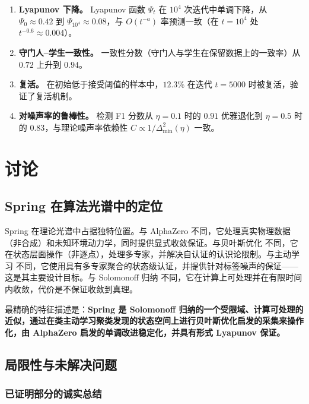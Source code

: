 \begin{enumerate}[nosep]
    \item \textbf{Lyapunov 下降。} Lyapunov 函数 $\Psi_t$ 在 $10^4$ 次迭代中单调下降，从 $\Psi_0 \approx 0.42$ 到 $\Psi_{10^4} \approx 0.08$，与 $O(t^{-a})$ 率预测一致（在 $t = 10^4$ 处 $t^{-0.6} \approx 0.004$）。
    \item \textbf{守门人--学生一致性。} 一致性分数（守门人与学生在保留数据上的一致率）从 $0.72$ 上升到 $0.94$。
    \item \textbf{复活。} 在初始低于接受阈值的样本中，$12.3\%$ 在迭代 $t = 5000$ 时被复活，验证了复活机制。
    \item \textbf{对噪声率的鲁棒性。} 检测 F1 分数从 $\eta = 0.1$ 时的 $0.91$ 优雅退化到 $\eta = 0.5$ 时的 $0.83$，与理论噪声率依赖性 $C \propto 1/\Delta_{\min}^2(\eta)$ 一致。
\end{enumerate}

\section{讨论}

\subsection{Spring 在算法光谱中的定位}

Spring 在理论光谱中占据独特位置。与 AlphaZero \citep{silver2017} 不同，它处理真实物理数据（非合成）和未知环境动力学，同时提供显式收敛保证。与贝叶斯优化 \citep{srinivas2010} 不同，它在状态层面操作（非逐点），处理多专家，并解决自认证的认识论限制。与主动学习 \citep{settles2009} 不同，它使用具有多专家聚合的状态级认证，并提供针对标签噪声的保证——这是其主要设计目标。与 Solomonoff 归纳 \citep{solomonoff1964} 不同，它在计算上可处理并在有限时间内收敛，代价是不保证收敛到真理。

最精确的特征描述是：\textbf{Spring 是 Solomonoff 归纳的一个受限域、计算可处理的近似，通过在类主动学习聚类发现的状态空间上进行贝叶斯优化启发的采集来操作化，由 AlphaZero 启发的单调改进稳定化，并具有形式 Lyapunov 保证。}

\subsection{局限性与未解决问题}\label{sec:open}

\subsubsection{已证明部分的诚实总结}

